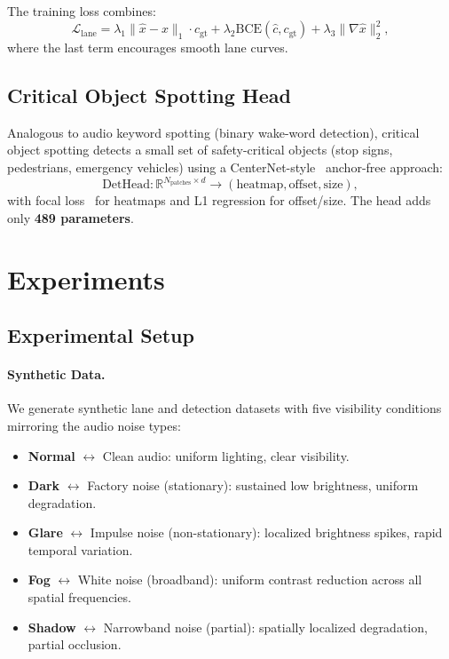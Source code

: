 \documentclass[10pt,twocolumn,letterpaper]{article}
\begin{document}
The training loss combines:
\begin{equation}
\mathcal{L}_{\text{lane}} = \lambda_1 \|\hat{x} - x\|_1 \cdot c_{\text{gt}} + \lambda_2 \text{BCE}(\hat{c}, c_{\text{gt}}) + \lambda_3 \|\nabla \hat{x}\|_2^2,
\end{equation}
where the last term encourages smooth lane curves.

\subsection{Critical Object Spotting Head}

Analogous to audio keyword spotting (binary wake-word detection), critical object spotting detects a small set of safety-critical objects (stop signs, pedestrians, emergency vehicles) using a CenterNet-style~\cite{zhou2019centernet} anchor-free approach:
\begin{equation}
\text{DetHead}: \mathbb{R}^{N_{\text{patches}} \times d} \to (\text{heatmap}, \text{offset}, \text{size}),
\end{equation}
with focal loss~\cite{lin2017focal} for heatmaps and L1 regression for offset/size.
The head adds only \textbf{489 parameters}.


\section{Experiments}
\label{sec:experiments}

\subsection{Experimental Setup}

\paragraph{Synthetic Data.}
We generate synthetic lane and detection datasets with five visibility conditions mirroring the audio noise types:
\begin{itemize}
\setlength\itemsep{0pt}
\item \textbf{Normal} $\leftrightarrow$ Clean audio: uniform lighting, clear visibility.
\item \textbf{Dark} $\leftrightarrow$ Factory noise (stationary): sustained low brightness, uniform degradation.
\item \textbf{Glare} $\leftrightarrow$ Impulse noise (non-stationary): localized brightness spikes, rapid temporal variation.
\item \textbf{Fog} $\leftrightarrow$ White noise (broadband): uniform contrast reduction across all spatial frequencies.
\item \textbf{Shadow} $\leftrightarrow$ Narrowband noise (partial): spatially localized degradation, partial occlusion.
\end{itemize}
\end{document}
